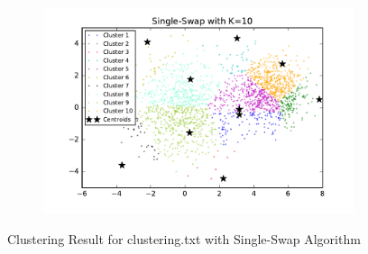 \begin{description}
\begin{description}
\begin{figure}[!h]
\begin{subfigure}[b]{0.475\textwidth}
        \end{subfigure}
        \hfill
        \begin{subfigure}[b]{0.475\textwidth}   
            \centering 
            \includegraphics[width=\textwidth]{./figures/clustering_singleSwap_10.pdf}
        \end{subfigure}
        
        \caption{Clustering Result for clustering.txt with Single-Swap Algorithm}
        \label{fig:single-swap-clusterimg}
\end{figure}


\end{description}
\end{description}
